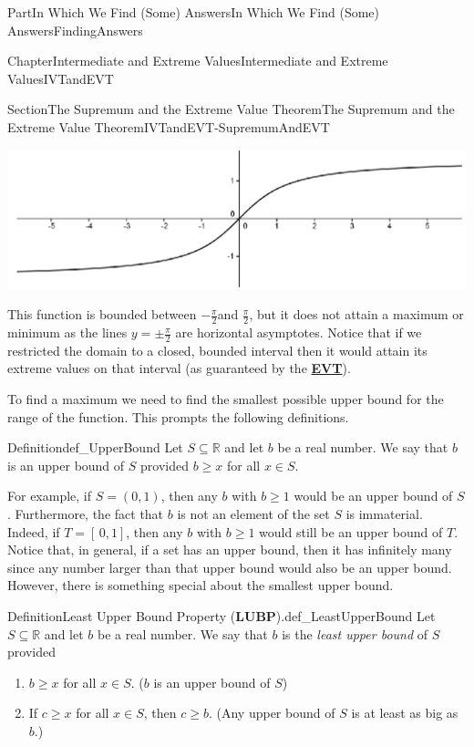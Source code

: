 \documentclass[oneside,10pt,]{book}
\newcommand{\terminology}[1]{\textbf{#1}}
\numberwithin{equation}{part}
\begin{document}
\begin{partptx}{Part}{In Which We Find (Some) Answers}{}{In Which We Find (Some) Answers}{}{}{FindingAnswers}
\begin{chapterptx}{Chapter}{Intermediate and Extreme Values}{}{Intermediate and Extreme Values}{}{}{IVTandEVT}
\begin{sectionptx}{Section}{The Supremum and the Extreme Value Theorem}{}{The Supremum and the Extreme Value Theorem}{}{}{IVTandEVT-SupremumAndEVT}
\begin{image}{0.125}{0.75}{0.125}{}
\includegraphics[width=\linewidth]{external/images/Ch6fig8-1.png}
\end{image}%
This function is bounded between \(-\frac{\pi}{2}\)and \(\frac{\pi}{2}\), but it does not attain a maximum or minimum as the lines \(y=\pm\frac{\pi}{2}\) are horizontal asymptotes. Notice that if we restricted the domain to a closed, bounded interval then it would attain its extreme values on that interval (as guaranteed by the \hyperref[thm_EVT]{\terminology{EVT}}).%
\par
To find a maximum we need to find the smallest possible upper bound for the range of the function. This prompts the following definitions.%
\begin{definition}{Definition}{}{def_UpperBound}%
%
%
Let \(S\subseteq\mathbb{R}\) and let \(b\) be a real number. We say that \(b\) is an upper bound of \(S\) provided \(b\geq x\) for all \(x\in S\).%
\end{definition}
For example, if \(S=(0,1)\), then any \(b\) with \(b\geq 1\) would be an upper bound of \(S\). Furthermore, the fact that \(b\) is not an element of the set \(S\) is immaterial. Indeed, if \(T=[\,0,1]\), then any \(b\) with \(b\geq 1\) would still be an upper bound of \(T\). Notice that, in general, if a set has an upper bound, then it has infinitely many since any number larger than that upper bound would also be an upper bound. However, there is something special about the smallest upper bound.%
\begin{definition}{Definition}{Least Upper Bound Property (\terminology{LUBP}).}{def_LeastUpperBound}%
%
%
%
Let \(S\subseteq\mathbb{R}\) and let \(b\) be a real number.  We say that \(b\) is the \emph{least upper bound} of \(S\) provided%
\par
%
\begin{enumerate}[label={(\alph*)}]
\item{}\(b\geq x\) for all \(x\in S\). (\(b\) is an upper bound of \(S\))%
\item{}If \(c\geq x\) for all \(x\in S\), then \(c\geq b\). (Any upper bound of \(S\) is at least as big as \(b\).)%

\end{enumerate}
\end{definition}
\end{sectionptx}
\end{chapterptx}
\end{partptx}
\end{document}
